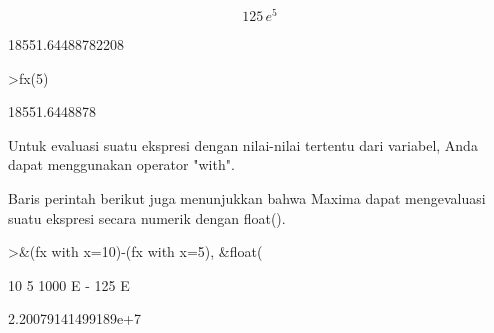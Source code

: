 \documentclass[a4paper,10pt]{article}
\begin{document}
\begin{eulernotebook}
\begin{eulercomment}
\begin{eulercomment}
\begin{euleroutput}
\end{euleroutput}
\begin{eulerformula}
\[
125\,e^5
\]
\end{eulerformula}
\begin{euleroutput}
  
                            18551.64488782208
  
\end{euleroutput}
\begin{eulerprompt}
>fx(5)
\end{eulerprompt}
\begin{euleroutput}
  18551.6448878
\end{euleroutput}
\begin{eulercomment}
Untuk evaluasi suatu ekspresi dengan nilai-nilai tertentu dari
variabel, Anda dapat menggunakan operator "with".

Baris perintah berikut juga menunjukkan bahwa Maxima dapat
mengevaluasi suatu ekspresi secara numerik dengan float().
\end{eulercomment}
\begin{eulerprompt}
>&(fx with x=10)-(fx with x=5), &float(%
\end{eulerprompt}
\begin{euleroutput}
  
                                  10        5
                            1000 E   - 125 E
  
  
                           2.20079141499189e+7
  

\end{euleroutput}
\end{eulercomment}
\end{eulercomment}
\end{eulernotebook}
\end{document}
